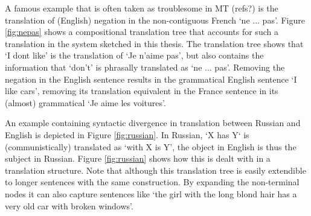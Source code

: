 \documentclass{report}
\theoremstyle{break}
\begin{document}
A famous example that is often taken as troublesome in MT (refs?) is the translation of (English) negation in the non-contiguous French `ne ... pas'. Figure \ref{fig:nepas} shows a compositional translation tree that accounts for such a translation in the system sketched in this thesis. The translation tree shows that `I dont like' is the translation of `Je n'aime pas', but also contains the information that `don't' is phrasally translated as `ne ... pas'. Removing the negation in the English sentence results in the grammatical English sentence `I like cars', removing its translation equivalent in the France sentence in its (almost) grammatical `Je aime les voitures'. 

An example containing syntactic divergence in translation between Russian and English is depicted in Figure \ref{fig:russian}. In Russian, `X has Y` is (communistically) translated as `with X is Y', the object in English is thus the subject in Russian. Figure \ref{fig:russian} shows how this is dealt with in a translation structure. Note that although this translation tree is easily extendible to longer sentences with the same construction. By expanding the non-terminal nodes it can also capture sentences like `the girl with the long blond hair has a very old car with broken windows'.
\end{document}
